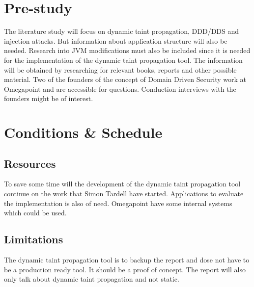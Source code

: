 \documentclass{../kththesis}
\begin{document}
\chapter{Pre-study}
The literature study will focus on dynamic taint propagation, DDD/DDS and injection attacks. But information about application structure will also be needed. Research into JVM modifications must also be included since it is needed for the implementation of the dynamic taint propagation tool. The information will be obtained by researching for relevant books, reports and other possible material. Two of the founders of the concept of Domain Driven Security work at Omegapoint and are accessible for questions. Conduction interviews with the founders might be of interest.



\chapter{Conditions \& Schedule}
\section{Resources}
To save some time will the development of the dynamic taint propagation tool continue on the work that Simon Tardell have started. Applications to evaluate the implementation is also of need. Omegapoint have some internal systems which could be used.


\section{Limitations}
The dynamic taint propagation tool is to backup the report and dose not have to be a production ready tool. It should be a proof of concept. The report will also only talk about dynamic taint propagation and not static. 
\end{document}
